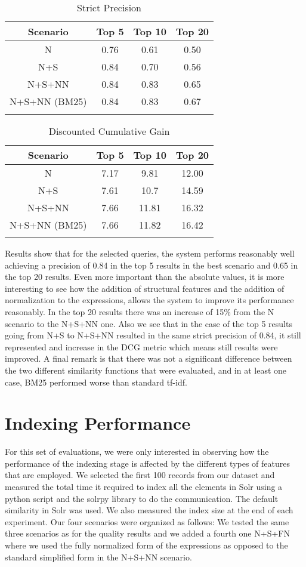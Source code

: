 \begin{longtable}{|c|c|c|c|}
\hline 
\textbf{Scenario} & \textbf{Top 5} & \textbf{Top 10} & \textbf{Top 20} \\ 
\hline 
N & 0.76 & 0.61 & 0.50 \\ 
\hline 
N+S & 0.84 & 0.70 & 0.56 \\ 
\hline 
N+S+NN & 0.84 & 0.83 & 0.65 \\ 
\hline 
N+S+NN (BM25) & 0.84 & 0.83 & 0.67 \\ 
\hline 

\caption{Strict Precision}
\label{stric_precision}
\end{longtable} 

\begin{longtable}{|c|c|c|c|}
\hline 
\textbf{Scenario} & \textbf{Top 5} & \textbf{Top 10} & \textbf{Top 20} \\ 
\hline 
N & 7.17 & 9.81 & 12.00 \\ 
\hline 
N+S & 7.61 & 10.7 & 14.59 \\ 
\hline 
N+S+NN & 7.66 & 11.81 & 16.32 \\ 
\hline 
N+S+NN (BM25) & 7.66 & 11.82 & 16.42 \\ 
\hline
\caption{Discounted Cumulative Gain}
\label{dcg}
\end{longtable} 

Results show that for the selected queries, the system performs reasonably well achieving a precision of 0.84 in the top 5 results in the best scenario and 0.65 in the top 20 results. 
Even more important than the absolute values, it is more interesting to see how the addition of structural features and the addition of normalization to the expressions, allows the system to improve its performance reasonably. In the top 20 results there was an increase of 15\% from the N scenario to the N+S+NN one. Also we see that in the case of the top 5 results going from N+S to N+S+NN resulted in the same strict precision of 0.84, it still represented and increase in the DCG metric which means still results were improved. 
A final remark is that there was not a significant difference between the two different similarity functions that were evaluated, and in at least one case, BM25 performed worse than standard tf-idf. 

\section{Indexing Performance}
For this set of evaluations, we were only interested in observing how the performance of the indexing stage is affected by the different types of features that are employed. We selected the first 100 records from our dataset and measured the total time it required to index all the elements in Solr using a python script and the solrpy library to do the communication. The default similarity in Solr was used. We also measured the index size at the end of each experiment.
Our four scenarios were organized as follows:
We tested the same three scenarios as for the quality results and we added a fourth one N+S+FN where we used the fully normalized form of the expressions as opposed to the standard simplified form in the N+S+NN scenario.

